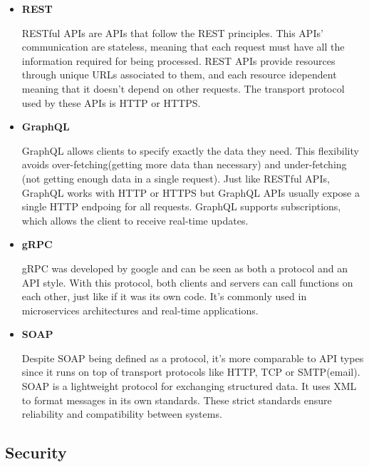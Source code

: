 \begin{itemize}
	\item \textbf{\gls{REST}}

	      \gls{REST}ful \gls{API}s are \gls{API}s that follow the \gls{REST} principles. This \gls{API}s'
	      communication are stateless, meaning that each request must have all
	      the information required for being processed.
	      \gls{REST} \gls{API}s provide resources through unique \gls{URL}s associated to them, and
	      each resource idependent meaning that it doesn't depend on other
	      requests. The transport protocol used by these \gls{API}s is \gls{HTTP} or \gls{HTTPS}.

	\item \textbf{GraphQL}

	      GraphQL allows clients to specify exactly the data they need. This
	      flexibility avoids over-fetching(getting more data than necessary) and
	      under-fetching (not getting enough data in a single request).
	      Just like \gls{REST}ful \gls{API}s, GraphQL works with \gls{HTTP} or \gls{HTTPS} but GraphQL \gls{API}s
	      usually expose a single \gls{HTTP} endpoing for all requests.
	      GraphQL supports subscriptions, which allows the client to receive
	      real-time updates.

	\item \textbf{gRPC}

	      \gls{gRPC} was developed by google and can be seen as both a protocol and an
	      \gls{API} style. With this protocol, both clients and servers can call
	      functions on each other, just like if it was its own code.
	      It's commonly used in microservices architectures and real-time applications.

	\item \textbf{\gls{SOAP}}

	      Despite \gls{SOAP} being defined as a protocol, it's more comparable to \gls{API}
	      types since it runs on top of transport protocols like \gls{HTTP}, \gls{TCP} or
	      \gls{SMTP}(email).
	      \gls{SOAP} is a lightweight protocol for exchanging structured data. It uses \gls{XML}
	      to format messages in its own standards. These strict standards ensure
	      reliability and compatibility between systems.

\end{itemize}
\subsection{Security}

